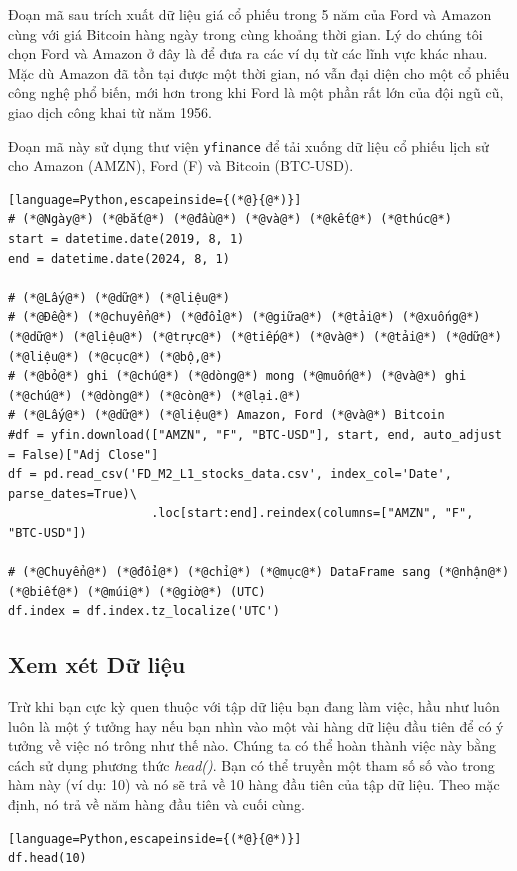 Đoạn mã sau trích xuất dữ liệu giá cổ phiếu trong 5 năm của Ford và Amazon cùng với giá Bitcoin hàng ngày trong cùng khoảng thời gian. Lý do chúng tôi chọn Ford và Amazon ở đây là để đưa ra các ví dụ từ các lĩnh vực khác nhau. Mặc dù Amazon đã tồn tại được một thời gian, nó vẫn đại diện cho một cổ phiếu công nghệ phổ biến, mới hơn trong khi Ford là một phần rất lớn của đội ngũ cũ, giao dịch công khai từ năm 1956.

Đoạn mã này sử dụng thư viện \texttt{yfinance} để tải xuống dữ liệu cổ phiếu lịch sử cho Amazon (AMZN), Ford (F) và Bitcoin (BTC-USD).

\begin{lstlisting}[language=Python,escapeinside={(*@}{@*)}]
# (*@Ngày@*) (*@bắt@*) (*@đầu@*) (*@và@*) (*@kết@*) (*@thúc@*)
start = datetime.date(2019, 8, 1)
end = datetime.date(2024, 8, 1)

# (*@Lấy@*) (*@dữ@*) (*@liệu@*)
# (*@Để@*) (*@chuyển@*) (*@đổi@*) (*@giữa@*) (*@tải@*) (*@xuống@*) (*@dữ@*) (*@liệu@*) (*@trực@*) (*@tiếp@*) (*@và@*) (*@tải@*) (*@dữ@*) (*@liệu@*) (*@cục@*) (*@bộ,@*) 
# (*@bỏ@*) ghi (*@chú@*) (*@dòng@*) mong (*@muốn@*) (*@và@*) ghi (*@chú@*) (*@dòng@*) (*@còn@*) (*@lại.@*)
# (*@Lấy@*) (*@dữ@*) (*@liệu@*) Amazon, Ford (*@và@*) Bitcoin
#df = yfin.download(["AMZN", "F", "BTC-USD"], start, end, auto_adjust = False)["Adj Close"]
df = pd.read_csv('FD_M2_L1_stocks_data.csv', index_col='Date', parse_dates=True)\
                    .loc[start:end].reindex(columns=["AMZN", "F", "BTC-USD"])

# (*@Chuyển@*) (*@đổi@*) (*@chỉ@*) (*@mục@*) DataFrame sang (*@nhận@*) (*@biết@*) (*@múi@*) (*@giờ@*) (UTC)
df.index = df.index.tz_localize('UTC')
\end{lstlisting}

\subsection{Xem xét Dữ liệu}

Trừ khi bạn cực kỳ quen thuộc với tập dữ liệu bạn đang làm việc, hầu như luôn luôn là một ý tưởng hay nếu bạn nhìn vào một vài hàng dữ liệu đầu tiên để có ý tưởng về việc nó trông như thế nào. Chúng ta có thể hoàn thành việc này bằng cách sử dụng phương thức \emph{head()}. Bạn có thể truyền một tham số số vào trong hàm này (ví dụ: 10) và nó sẽ trả về 10 hàng đầu tiên của tập dữ liệu. Theo mặc định, nó trả về năm hàng đầu tiên và cuối cùng.

\begin{lstlisting}[language=Python,escapeinside={(*@}{@*)}]
df.head(10)
\end{lstlisting}

